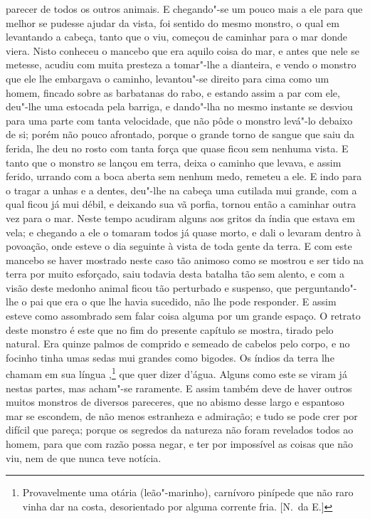 parecer de todos os outros animais. E chegando"-se um pouco mais a ele
para que melhor se pudesse ajudar da vista, foi sentido do mesmo
monstro, o qual em levantando a cabeça, tanto que o viu, começou de
caminhar para o mar donde viera. Nisto conheceu o mancebo que
era aquilo coisa do mar, e antes que nele se metesse, acudiu com muita
presteza a tomar"-lhe a dianteira, e vendo o monstro que ele lhe embargava 
o caminho, levantou"-se direito para cima como um homem, fincado sobre as 
barbatanas do rabo, e estando assim a par com ele, deu"-lhe uma estocada pela 
barriga, e dando"-lha no mesmo instante se desviou para uma parte com tanta velocidade,
que não pôde o monstro levá"-lo debaixo de si; porém não pouco afrontado, porque o grande torno
de sangue que saiu da ferida, lhe deu no rosto com tanta força que
quase ficou sem nenhuma vista. E tanto que o monstro se lançou em terra,
deixa o caminho que levava, e assim ferido, urrando com a boca aberta sem
nenhum medo, remeteu a ele. E indo para o tragar a unhas e a dentes,
deu"-lhe na cabeça uma cutilada mui grande, com a qual ficou já mui
débil, e deixando sua vã porfia, tornou então a caminhar outra vez para
o mar. Neste tempo acudiram alguns  aos gritos da índia que
estava em vela; e chegando a ele o tomaram todos já quase morto, e dali
o levaram dentro à povoação, onde esteve o dia seguinte à vista de toda
gente da terra. E com este mancebo se haver mostrado neste caso tão
animoso como se mostrou e ser tido na terra por muito esforçado, saiu
todavia desta batalha tão sem alento, e com a visão deste medonho
animal ficou tão perturbado e suspenso, que perguntando"-lhe o pai que
era o que lhe havia sucedido, não lhe pode responder. E assim esteve
como assombrado sem falar coisa alguma por um grande espaço. O retrato
deste monstro é este que no fim do presente capítulo se mostra, tirado
pelo natural. Era quinze palmos de comprido e semeado de cabelos pelo
corpo, e no focinho tinha umas sedas mui grandes como bigodes. Os índios
da terra lhe chamam em sua língua ,\footnote{ Provavelmente uma otária 
(leão"-marinho), carnívoro pinípede que não raro vinha dar na costa, 
desorientado por alguma corrente fria. [N.~da E.]} que quer dizer 
d'água. Alguns como este se viram já nestas partes, mas acham"-se
raramente. E assim também deve de haver outros muitos monstros de
diversos pareceres, que no abismo desse largo e espantoso mar se
escondem, de não menos estranheza e admiração; e tudo se pode crer por
difícil que pareça; porque os segredos da natureza não foram revelados
todos ao homem, para que com razão possa negar, e ter por impossível as
coisas que não viu, nem de que nunca teve notícia.					%

